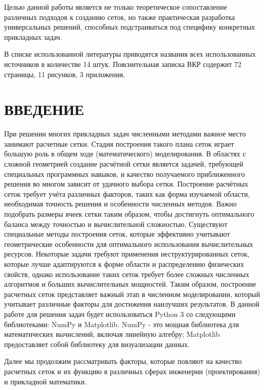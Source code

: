 \documentclass[a4paper,14pt,russian]{extreport}
\renewcommand{\_}{\kern-1.5pt\textunderscore\kern-1.5pt}
\begin{document}
Целью данной работы является не только теоретическое сопоставление различных подходов к созданию сеток, но также практическая разработка универсальных решений, способных подстраиваться под специфику конкретных прикладных задач.

В списке использованной литературы приводятся названия всех использованных 
источников в количестве 14 штук.
Пояснительная записка ВКР содержит 72 страницы, 11 рисунков, 3 приложения. 
	
	
	\newpage
	\renewcommand\contentsname{\centerline{СОДЕРЖАНИЕ}}
	\thispagestyle{empty}
	\tableofcontents
	\thispagestyle{empty}
	
\chapter{ВВЕДЕНИЕ}
    При решении многих прикладных задач численными методами важное место занимают расчетные сетки. Стадия построения такого плана сеток играет большую роль в общем ходе (математического) моделирования. В областях с сложной геометрией создание расчётной сетки является задачей, требующей специальных программных навыков, и качество получаемого приближенного решения во многом зависит от удачного выбора сетки. Построение расчётных сеток требует учёта различных факторов, таких как форма изучаемой области, необходимая точность решения и особенности численных методов. Важно подобрать размеры ячеек сетки таким образом, чтобы достигнуть оптимального баланса между точностью и вычислительной сложностью. Существуют специальные методы построения сеток, которые эффективно учитывают геометрические особенности для оптимального использования вычислительных ресурсов. Некоторые задачи требуют применения неструктурированных сеток, которые лучше адаптируются к форме области и распределению физических свойств, однако использование таких сеток требует более сложных численных алгоритмов и больших вычислительных мощностей. Таким образом, построение расчетных сеток представляет важный этап в численном моделировании, который учитывает различные факторы для достижения наилучших результатов. В данной работе для решения задач будет использоваться Python 3 со следующими библиотеками: NumPy и Matplotlib. NumPy - это мощная библиотека для математических вычислений, включая линейную алгебру; Matplotlib предоставляет собой библиотеку для визуализации данных. 
\par Далее мы продолжим рассматривать факторы, которые повляют на качество расчетных сеток и их функцию в различных сферах инженерии (проектирования) и прикладной математики.
\end{document}
